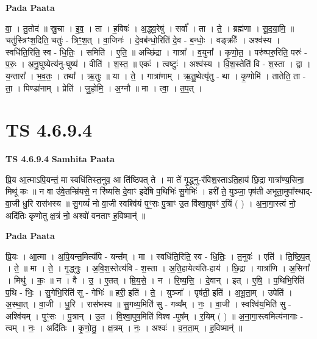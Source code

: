 \documentclass[17pt]{extarticle}
\begin{document}
\textbf{Pada Paata} \newline

वा॒ । तु॒तोद॑ ॥ स्रु॒चा । इ॒व॒ । ता । ह॒विषः॑ । अ॒द्ध्व॒रेषु॑ । सर्वा᳚ । ता । ते॒ । ब्रह्म॑णा । सू॒द॒या॒मि॒ ॥ चतु॑स्त्रिꣳश॒दिति॒ चतुः॑ - त्रिꣳ॒॒श॒त् । वा॒जिनः॑ । दे॒वब॑न्धो॒रिति॑ दे॒व - ब॒न्धोः॒ । वङ्क्रीः᳚ । अश्व॑स्य । स्वधि॑ति॒रिति॒ स्व - धि॒तिः॒ । समिति॑ । ए॒ति॒ ॥ अच्छि॑द्रा । गात्रा᳚ । व॒युना᳚ । कृ॒णो॒त॒ । परु॑ष्परु॒रिति॒ परुः॑ - प॒रुः॒ । अ॒नु॒घुष्येत्य॑नु-घुष्य॑ । वीति॑ । श॒स्त॒ ॥ एकः॑ । त्वष्टुः॑ । अश्व॑स्य । वि॒श॒स्तेति॑ वि - श॒स्ता । द्वा । य॒न्तारा᳚ । भ॒व॒तः॒ । तथा᳚ । ऋ॒तुः ॥ या । ते॒ । गात्रा॑णाम् । ऋ॒तु॒थेत्यृ॑तु - था । कृ॒णोमि॑ । तातेति॒ ता - ता॒ । पिण्डा॑नाम् । प्रेति॑ । जु॒हो॒मि॒ । अ॒ग्नौ ॥ मा । त्वा॒ । त॒प॒त् ।  \newline




\section*{ TS 4.6.9.4 }

\textbf{TS 4.6.9.4 } \newline
\textbf{Samhita Paata} \newline

प्रि॒य आ॒त्माऽपि॒यन्तं॒ मा स्वधि॑तिस्त॒नुव॒ आ ति॑ष्ठिपत् ते । मा ते॑ गृ॒द्ध्नु-र॑विश॒स्ताऽति॒हाय॑ छि॒द्रा गात्रा᳚ण्य॒सिना॒ मिथू॑ कः ॥ न वा उ॑वे॒तन्म्रि॑यसे॒ न रि॑ष्यसि दे॒वाꣳ इदे॑षि प॒थिभिः॑ सु॒गेभिः॑ । हरी॑ ते॒ युञ्जा॒ पृष॑ती अभूता॒मुपा᳚स्थाद्-वा॒जी धु॒रि रास॑भस्य ॥ सु॒गव्यं॑ नो वा॒जी स्वश्वि॑यं पुꣳ॒॒सः पु॒त्राꣳ उ॒त वि॑श्वा॒पुषꣳ॑ र॒यिं ( ) । अ॒ना॒गा॒स्त्वं नो॒ अदि॑तिः कृणोतु क्ष॒त्रं नो॒ अश्वो॑ वनताꣳ ह॒विष्मान्॑ ॥ \newline

\textbf{Pada Paata} \newline

प्रि॒यः । आ॒त्मा । अ॒पि॒यन्त॒मित्य॑पि - यन्त᳚म् । मा । स्वधि॑ति॒रिति॒ स्व - धि॒तिः॒ । त॒नुवः॑ । एति॑ । ति॒ष्ठि॒प॒त् । ते॒ ॥ मा । ते॒ । गृ॒द्ध्नुः । अ॒वि॒श॒स्तेत्य॑वि - श॒स्ता । अ॒ति॒हायेत्य॑ति-हाय॑ । छि॒द्रा । गात्रा॑णि । अ॒सिना᳚ । मिथु॑ । कः॒ ॥ न । वै । उ॒ । ए॒तत् । म्रि॒य॒से॒ । न । रि॒ष्य॒सि॒ । दे॒वान् । इत् । ए॒षि॒ । प॒थिभि॒रिति॑ प॒थि - भिः॒ । सु॒गेभि॒रिति॑ सु - गेभिः॑ ॥ हरी॒ इति॑ । ते॒ । युञ्जा᳚ । पृष॑ती॒ इति॑ । अ॒भू॒ता॒म् । उपेति॑ । अ॒स्था॒त् । वा॒जी । धु॒रि । रास॑भस्य ॥ सु॒गव्य॒मिति॑ सु - गव्य᳚म् । नः॒ । वा॒जी । स्वश्वि॑य॒मिति॑ सु - अश्वि॑यम् । पुꣳ॒॒सः । पु॒त्रान् । उ॒त । वि॒श्वा॒पुष॒मिति॑ विश्व -पुष᳚म् । र॒यिम् ( ) ॥ अ॒ना॒गा॒स्त्वमित्य॑नागाः - त्वम् । नः॒ । अदि॑तिः । कृ॒णो॒तु॒ । क्ष॒त्रम् । नः॒ । अश्वः॑ । व॒न॒ता॒म् । ह॒विष्मान्॑ ॥  \newline
\end{document}
